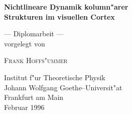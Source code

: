 \begin{titlepage}
\Large
\sffamily
\vfill

\begin{center}
{\bfseries\huge Nichtlineare Dynamik kolumn"arer\\[0.6ex] Strukturen im visuellen Cortex}

\vfill

{--- Diplomarbeit ---\\ vorgelegt von}

\bigskip
\bigskip

\rmfamily
\textsc{Frank Hoffs"ummer}
\sffamily

\vfill

\begin{figure}[h]
\begin{center}
\end{center}
\end{figure}

{Institut f"ur Theoretische Physik\\
Johann Wolfgang Goethe--Universit"at\\
Frankfurt am Main\\
Februar 1996}
\end{center}

\vfill
\normalsize
\normalfont
\end{titlepage}


\tableofcontents

